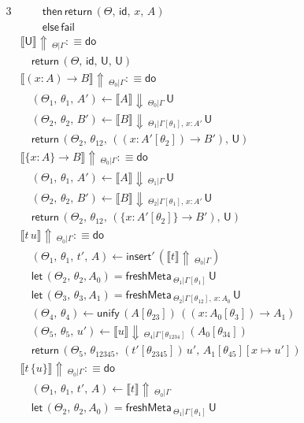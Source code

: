 \documentclass[acmsmall,review,anonymous,prologue,dvipsnames]{acmart}\settopmatter{printfolios=true,printccs=false,printacmref=false}
\newcommand{\slet}{\boldsymbol{\mathsf{let}}}
\renewcommand{\U}{\mathsf{U}}
\newcommand{\id}{\mathsf{id}}
\newcommand{\freshMeta}[3]{\mathsf{freshMeta}\,_{#1|#2}\,#3}
\newcommand{\unify}{\mathsf{unify}}
\newcommand{\fail}{\mathsf{fail}}
\newcommand{\echeck}[4]{\llbracket#1\rrbracket\!\Downarrow\,_{#2|#3}\,#4}
\newcommand{\einfer}[3]{\llbracket#1\rrbracket\!\Uparrow\,_{#2|#3}}
\newcommand{\edo}{\boldsymbol{\mathsf{do}}}
\newcommand{\ereturn}{\boldsymbol{\mathsf{return}}}
\newcommand{\ethen}{\boldsymbol{\mathsf{then}}}
\newcommand{\eelse}{\boldsymbol{\mathsf{else}}}
\newcommand{\einsert}{\mathsf{insert}}
\theoremstyle{remark}
\begin{document}
\begin{alignat*}{3}
  &\qquad   \ethen\, \ereturn\,(\Theta,\,\id,\,x,\,A)\\
  &\qquad   \eelse\, \fail\\
  &\einfer{\U}{\Theta}{\Gamma} :\equiv \edo\\
  &\quad\ereturn\,(\Theta,\,\id,\,\U,\,\U)\\
  &\einfer{(x : A)\to B}{\Theta_0}{\Gamma} :\equiv \edo\\
  &\quad(\Theta_1,\,\theta_1,\,A') \leftarrow \echeck{A}{\Theta_0}{\Gamma}{\U}\\
  &\quad(\Theta_2,\,\theta_2,\,B') \leftarrow
                 \echeck{B}{\Theta_1}{\Gamma[\theta_1],\,x : A'}{\U}\\
  &\quad\ereturn\,(\Theta_2,\,\theta_{12},
                 \,((x : A'[\theta_2])\to B'),\,\U)\\
  &\einfer{\{x : A\}\to B}{\Theta_0}{\Gamma} :\equiv \edo\\
  &\quad(\Theta_1,\,\theta_1,\,A') \leftarrow \echeck{A}{\Theta_1}{\Gamma}{\U}\\
  &\quad(\Theta_2,\,\theta_2,\,B') \leftarrow
                 \echeck{B}{\Theta_2}{\Gamma[\theta_1],\,x : A'}{\U}\\
  &\quad\ereturn\,(\Theta_2,\,\theta_{12},
                 \,(\{x : A'[\theta_2]\}\to B'),\,\U)\\
  &\einfer{t\,u}{\Theta_0}{\Gamma} :\equiv \edo \\
  &\quad (\Theta_1,\,\theta_1,\,t',\,A) \leftarrow \einsert'\,(\einfer{t}{\Theta_0}{\Gamma})\\
  &\quad \slet\,(\Theta_2,\,\theta_2,A_0) = \freshMeta{\Theta_1}{\Gamma[\theta_1]}{\U}\\
  &\quad \slet\,(\Theta_3,\,\theta_3,A_1) = \freshMeta{\Theta_2}{\Gamma[\theta_{12}],\,x:A_0}{\U}\\
  &\quad (\Theta_4,\,\theta_4) \leftarrow \unify\,(A[\theta_{23}])\,((x : A_0[\theta_3])\to A_1)\\
  &\quad (\Theta_5,\,\theta_5,\,u') \leftarrow \echeck{u}{\Theta_4}{\Gamma[\theta_{1234}]}{(A_0[\theta_{34}])}\\
  &\quad \ereturn\,(\Theta_5,\,\theta_{12345},\,(t'[\theta_{2345}])\,u',\,A_1[\theta_{45}][x\mapsto u'])\\
  &\einfer{t\,\{u\}}{\Theta_0}{\Gamma} :\equiv \edo \\
  &\quad (\Theta_1,\,\theta_1,\,t',\,A) \leftarrow \einfer{t}{\Theta_0}{\Gamma}\\
  &\quad \slet\,(\Theta_2,\,\theta_2,A_0) = \freshMeta{\Theta_1}{\Gamma[\theta_1]}{\U}\\

\end{alignat*}
\end{document}
